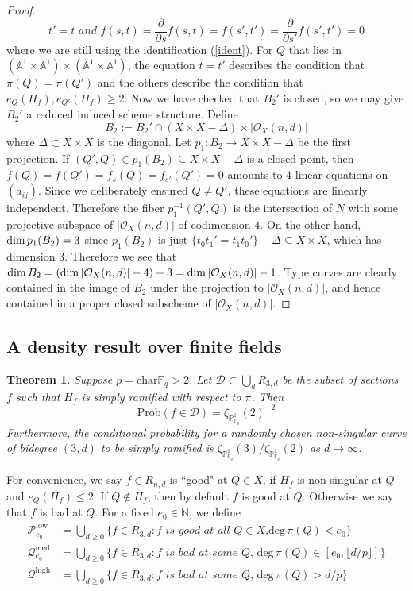 \documentclass[12pt]{article}
\theoremstyle{plain}
\newtheorem{theorem}[equation]{Theorem}
\theoremstyle{definition}
\newcommand{\IA}{\mathbb{A}}
\newcommand{\IN}{\mathbb{N}}
\newcommand{\IF}{\mathbb{F}}
\newcommand{\IP}{\mathbb{P}}
\newcommand{\sD}{\mathcal{D}}
\newcommand{\sO}{\mathcal{O}}
\newcommand{\sP}{\mathcal{P}}
\newcommand{\sQ}{\mathcal{Q}}
\renewcommand{\deg}{\mathrm{deg}\,}
\renewcommand\dim{{\rm dim\,}}
\newcommand\union{\bigcup}
\newcommand{\<}{\langle}
\renewcommand{\>}{\rangle}
\newcommand{\p}{\partial}
\newcommand{\Prob}{\mathrm{Prob}}
\begin{document}
\begin{proof}
\begin{equation} t' = t \textit{ and } f(s, t) = \frac{\p}{\p s}f(s, t) = f(s', t') = \frac{\p}{\p s'}f(s', t') = 0 \end{equation}
where we are still using the identification (\ref{ident}). For $Q$ that lies in $(\IA^1 \times \IA^1) \times (\IA^1 \times \IA^1)$, the equation $t = t'$ describes the condition that $\pi(Q)= \pi(Q')$ and the others describe the condition that $e_{Q}(H_f), e_{Q'}(H_f) \ge 2$.  Now we have checked that $B_2'$ is closed, so we may give $B_2'$ a reduced induced scheme structure. Define $$B_2 := B_2' \cap (X \times X - \Delta) \times |\sO_X(n, d)|$$ where $\Delta \subset X \times X$ is the diagonal. Let $p_1 : B_2 \to X \times X - \Delta$ be the first projection. If $(Q', Q) \in p_1(B_2) \subseteq X \times X - \Delta$ is a closed point, then $f(Q) = f(Q') = f_s(Q) = f_{s'}(Q') = 0$ amounts to $4$ linear equations on $(a_{ij})$. Since we deliberately ensured $Q \neq Q'$, these equations are linearly independent. Therefore the fiber $p_1^{-1}(Q', Q)$ is the intersection of $N$ with some projective subspace of $|\sO_X(n, d)|$ of codimension $4$. On the other hand, $\dim p_1(B_2) = 3$ since $p_1(B_2)$ is just $\{ t_0 t_1' = t_1 t_0' \} - \Delta \subseteq X \times X$, which has dimension $3$. Therefore we see that $\dim B_2 = (\dim |\sO_X(n, d)| - 4) + 3 = \dim |\sO_X(n, d)| -1$. Type \uppercase\expandafter{} curves are clearly contained in the image of $B_2$ under the projection to $|\sO_X(n, d)|$, and hence contained in a proper closed subscheme of $|\sO_X(n, d)|$.
\end{proof}

\subsection{A density result over finite fields}
\begin{theorem}
\label{main}
Suppose $p = \mathrm{char } \IF_q > 2$. Let $\sD \subset \union_d R_{3,d}$ be the subset of sections $f$ such that $H_f$ is simply ramified with respect to $\pi$. Then
$$ \Prob(f \in \sD) = \zeta_{\IP^1_{\IF_q}}(2)^{-2} $$ Furthermore, the conditional probability for a randomly chosen non-singular curve of bidegree $(3, d)$ to be simply ramified is $\zeta_{\IP^1_{\IF_q}}(3)/\zeta_{\IP^1_{\IF_q}}(2)$ as $d \to \infty$. 
\end{theorem}
For convenience, we say $f \in R_{n, d}$ is ``good" at $Q \in X$, if $H_f$ is non-singular at $Q$ and $e_Q(H_f) \le 2$. If $Q \not\in H_f$, then by default $f$ is good at $Q$. Otherwise we say that $f$ is bad at $Q$. For a fixed $e_0 \in \IN$, we define 
\begin{align*}
\sP_{e_0}^{\mathrm{low}} &= \union_{d \ge 0} \{ f \in R_{3, d} : f \textit{ is good at all $Q \in X$,}\deg \pi(Q) < e_0\}\\
\sQ_{e_0}^{\mathrm{med}} &= \union_{d \ge 0} \{f \in R_{3, d} : f \textit{ is bad at some $Q$, }\deg \pi(Q) \in [e_0, \lfloor d/p \rfloor]\}\\
\sQ^{\mathrm{high}} &= \union_{d \ge 0} \{f \in R_{3, d} : f \textit{ is bad at some $Q$, }\deg \pi(Q) > d/p\}
\end{align*}
\end{document}
